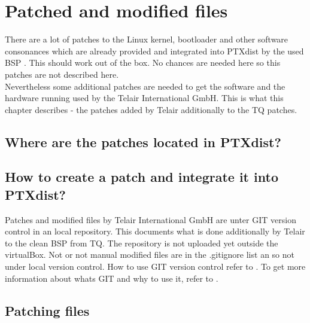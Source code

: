 \chapter{Patched and modified files}%
\label{cha:Patched and modified files}
There are a lot of patches to the Linux kernel, bootloader and other software
consonances which are already provided and integrated into PTXdist by the
used BSP \cite{BSP_119}. This should work out of the box. No chances are needed
here so this patches are not described here.
\\
Nevertheless some additional patches are needed to get the software and the
hardware running used by the Telair International GmbH. This is what this
chapter describes - the patches added by Telair additionally to the TQ patches.

\section{Where are the patches located in PTXdist?}%
\label{sec:Where are the patches located in PTXdist}



\section{How to create a patch and integrate it into PTXdist?}%
\label{sec:How to create a patch and integrate it into PTXdist?}

Patches and modified files by Telair International GmbH are unter GIT version
control in an local repository. This documents what is done additionally
by Telair to the clean BSP from TQ. The repository is not uploaded yet outside
the virtualBox. Not or not manual modified files are in the .gitignore list an
so not under local version control. How to use GIT version control refer to
\cite[GIT howto]{git_howto}. To get more information about whats GIT and why to
use it, refer to \cite[GIT Homepage]{git_homepage}.










\section{Patching files}%
\label{sec:Pached files}

